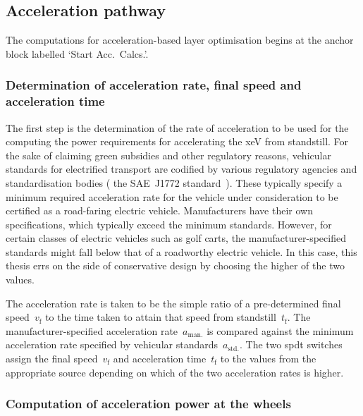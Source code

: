 \subsection{Acceleration pathway}

The computations for acceleration-based layer  optimisation begins at the anchor
block labelled `Start Acc.\ Calcs.'.

\subsubsection*{Determination of acceleration rate, final speed and acceleration time}

The  first   step  is  the  determination   of  the  rate  of   acceleration  to
be  used  for  the  computing   the  power  requirements  for  accelerating  the
\gls{xeV}  from  standstill.  For  the  sake of  claiming  green  subsidies  and
other  regulatory reasons,  vehicular  standards for  electrified transport  are
codified by  various regulatory agencies  and standardisation bodies  (\eg{} the
SAE~J1772 standard~\cite{Sae2010}).  These typically specify a  minimum required
acceleration  rate for  the vehicle  under consideration  to be  certified as  a
road-faring electric vehicle. Manufacturers have their own specifications, which
typically exceed the minimum standards. However, for certain classes of electric
vehicles such  as golf  carts, the  manufacturer-specified standards  might fall
below that of a  roadworthy electric vehicle. In this case,  this thesis errs on
the side of conservative design by choosing the higher of the two values.

The   acceleration   rate   is   taken   to   be   the   simple   ratio   of   a
pre-determined  final  speed~$v_\text{f}$  to  the time  taken  to  attain  that
speed  from  standstill~$t_\text{f}$.  The  manufacturer-specified  acceleration
rate~$a_\text{man.}$ is compared against the minimum acceleration rate specified
by vehicular  standards~$a_\text{std.}$. The two \gls{spdt}  switches assign the
final speed~$v_\text{f}$  and acceleration time~$t_\text{f}$ to  the values from
the  appropriate source  depending on  which of  the two  acceleration rates  is
higher.

\subsubsection*{Computation of acceleration power at the wheels}

